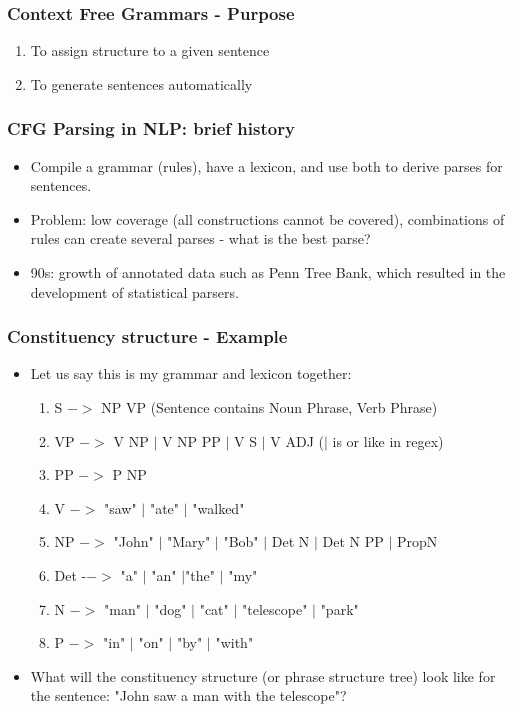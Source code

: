 \documentclass{beamer}
\begin{document}
\begin{frame}
\frametitle{Context Free Grammars - Purpose}
\begin{enumerate}
\item To assign structure to a given sentence
\item To generate sentences automatically
\end{enumerate}
\end{frame}

\begin{frame}
\frametitle{CFG Parsing in NLP: brief history}
\begin{itemize}
\item Compile a grammar (rules), have a lexicon, and use both to derive parses for sentences.
\item Problem: low coverage (all constructions cannot be covered), combinations of rules can create several parses - what is the best parse?
\item 90s: growth of annotated data such as Penn Tree Bank, which resulted in the development of statistical parsers.
\end{itemize}
\end{frame}

\begin{frame}
\frametitle{Constituency structure - Example}
\begin{itemize}
\item Let us say this is my grammar and lexicon together:
\begin{enumerate}
\item S $->$ NP VP (Sentence contains Noun Phrase, Verb Phrase)
\item  VP $->$ V NP $|$ V NP PP $|$ V S $|$ V ADJ ($|$ is or like in regex)
\item PP $->$ P NP
\item V $->$ "saw" $|$ "ate" $|$ "walked"
\item  NP $->$ "John" $|$ "Mary" $|$ "Bob" $|$ Det N $|$ Det N PP $|$ PropN 
 \item Det -$->$ "a" $|$ "an" $|$"the" $|$ "my"
 \item N $->$ "man" $|$ "dog" $|$ "cat" $|$ "telescope" $|$ "park"
 \item P $->$ "in" $|$ "on" $|$ "by" $|$ "with"
\end{enumerate}
\item What will the constituency structure (or phrase structure tree) look like for the sentence: "John saw a man with the telescope"?
\end{itemize}
\end{frame}
\end{document}
